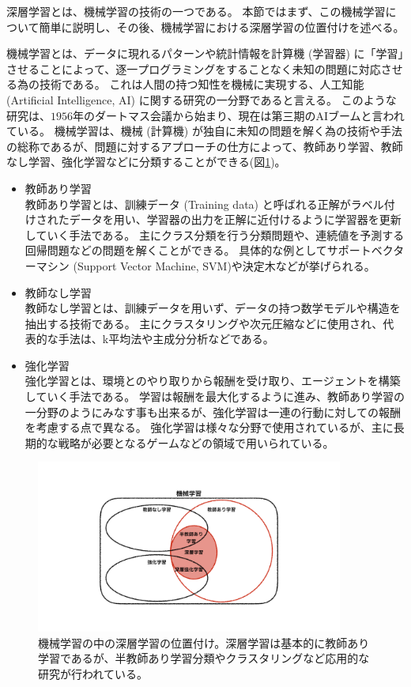深層学習とは、機械学習の技術の一つである。
本節ではまず、この機械学習について簡単に説明し、その後、機械学習における深層学習の位置付けを述べる。

機械学習とは、データに現れるパターンや統計情報を計算機 (学習器) に「学習」させることによって、逐一プログラミングをすることなく未知の問題に対応させる為の技術である。
これは人間の持つ知性を機械に実現する、人工知能 (Artificial Intelligence, AI) に関する研究の一分野であると言える。
このような研究は、$1956$年のダートマス会議\cite{Dartmouth}から始まり、現在は第三期のAIブームと言われている。
機械学習は、機械 (計算機) が独自に未知の問題を解く為の技術や手法の総称であるが、問題に対するアプローチの仕方によって、教師あり学習、教師なし学習、強化学習などに分類することができる(図\ref{1MachineLearning})。

\begin{itemize}
  \item 教師あり学習\\
  教師あり学習とは、訓練データ (Training data) と呼ばれる正解がラベル付けされたデータを用い、学習器の出力を正解に近付けるように学習器を更新していく手法である。
  主にクラス分類を行う分類問題や、連続値を予測する回帰問題などの問題を解くことができる。
  具体的な例としてサポートベクターマシン (Support Vector Machine, SVM\cite{PatternRecognitionUsingGeneralizedPortraitMethod,TrainingAlgorithmforOptimalMarginClassifiers})や決定木などが挙げられる。
  \item 教師なし学習\\
  教師なし学習とは、訓練データを用いず、データの持つ数学モデルや構造を抽出する技術である。
  主にクラスタリングや次元圧縮などに使用され、代表的な手法は、k平均法や主成分分析などである。
  \item 強化学習\\
  強化学習とは、環境とのやり取りから報酬を受け取り、エージェントを構築していく手法である。
  学習は報酬を最大化するように進み、教師あり学習の一分野のようにみなす事も出来るが、強化学習は一連の行動に対しての報酬を考慮する点で異なる。
  強化学習は様々な分野で使用されているが、主に長期的な戦略が必要となるゲームなどの領域で用いられている。
\end{itemize}

\begin{figure}[htbp]
 \centering
 \includegraphics[trim = 0 100 0 50, width=0.9\textwidth, clip]{Figure/2DeepLearning/1MachineLearning.png}
 \caption[機械学習の中の深層学習の位置付け]{機械学習の中の深層学習の位置付け。深層学習は基本的に教師あり学習であるが、半教師あり学習分類やクラスタリングなど応用的な研究が行われている。}
 \label{1MachineLearning}
\end{figure}

